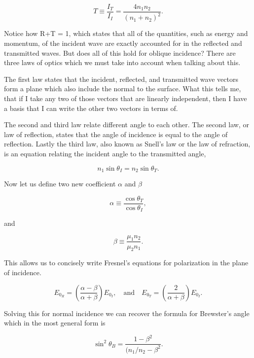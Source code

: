 \documentclass[preprint, review,12pt]{elsarticle}
\def\={\equiv}
\def\and{\quad \text{and} \quad}
\def\9{\left(}
\def\0{\right)}
\begin{document}
\begin{equation}
    T \= \frac{I_T}{I_I} = \frac{4n_1n_2}{(n_1 + n_2)^2}.
\end{equation}

Notice how R+T = 1, which states that all of the quantities, such as energy and momentum, of the incident wave are exactly accounted for in the reflected and transmitted waves. But does all of this hold for oblique incidence? There are three laws of optics which we must take into account when talking about this.

The first law states that the incident, reflected, and transmitted wave vectors form a plane which also include the normal to the surface. What this tells me, that if I take any two of those vectors that are linearly independent, then I have a basis that I can write the other two vectors in terms of.

The second and third law relate different angle to each other. The second law, or law of reflection, states that the angle of incidence is equal to the angle of reflection. Lastly the third law, also known as Snell's law or the law of refraction, is an equation relating the incident angle to the transmitted angle,

\begin{equation}
      n_1 \sin\theta_I = n_2\sin\theta_T.
\end{equation}

Now let us define two new coefficient $\alpha$ and $\beta$

\begin{equation}
    \alpha \= \frac{\cos\theta_T}{\cos\theta_I},
\end{equation}

and

\begin{equation}
    \beta \= \frac{\mu_1n_2}{\mu_2n_1}.
\end{equation}

This allows us to concisely write Fresnel's equations for polarization in the plane of incidence. 

\begin{equation}
    E_{0_R} = \9 \frac{\alpha - \beta}{\alpha + \beta} \0 E_{0_I}, \and E_{0_T} = \9\frac{2}{\alpha + \beta}\0 E_{0_I}.
\end{equation}

Solving this for normal incidence we can recover the formula for Brewster's angle which in the most general form is

\begin{equation}
    \sin^2\theta_B = \frac{1-\beta^2}{(n_1/n_2 -\beta^2}.
\end{equation}
\end{document}
